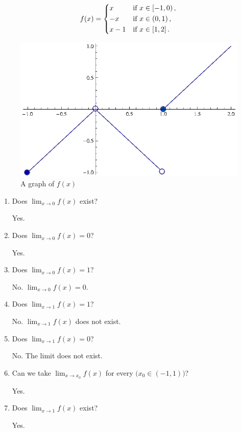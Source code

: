 \begin{ex}
  \[ f(x)=
    \begin{dcases}
      x &\text{if } x \in \left[ -1,0 \right), \\
      -x &\text{if } x \in \left (0,1 \right),  \\
      x-1 &\text{if } x \in \left[1, 2\right].
    \end{dcases}
    \]
  \begin{figure}[h]
    \begin{center}
      \includegraphics{graphs/pwlimex1}
    \end{center}
    \caption{A graph of \(f(x)\)}
    \label{fig:pwlimex1}
  \end{figure}
  \begin{enumerate}
    \item Does \( \lim_{x\to 0} f(x) \) exist?
      \begin{sol}
        Yes.
      \end{sol}
    \item Does \( \lim_{x \to 0} f(x)=0 \)?
      \begin{sol}
        Yes.
      \end{sol}
    \item Does \(\lim_{x \to 0} f(x)=1\)?
      \begin{sol}
        No. \(\lim_{x \to 0} f(x)=0\).
      \end{sol}
    \item Does \(\lim_{x \to 1} f(x)=1\)?
      \begin{sol}
        No. \( \lim_{x \to 1} f(x) \) does not exist.
      \end{sol}
    \item Does \(\lim_{x \to 1} f(x)=0\)?
      \begin{sol}
        No. The limit does not exist.
      \end{sol}
    \item Can we take \( \lim_{x \to x_0} f(x)\) for every \(\big(x_0 \in (-1, 1)\big)\)?
      \begin{sol}
        Yes.
      \end{sol}
    \item Does \( \lim_{x \to 1} f(x) \) exist?
      \begin{sol}
        Yes.
      \end{sol}
  \end{enumerate}
\end{ex}
